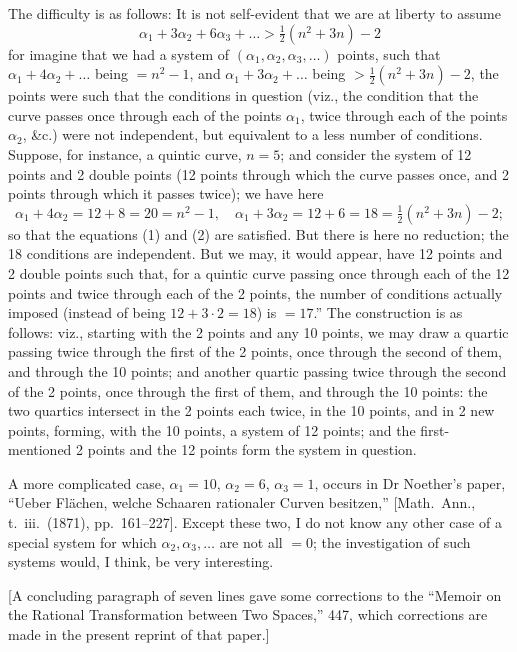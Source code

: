 \documentclass[11pt,a4paper]{article}
\begin{document}
The difficulty is as follows: It is not self-evident that we are at liberty to assume
\[
\alpha_1 + 3\alpha_2 + 6\alpha_3 + \ldots > \tfrac{1}{2}(n^2 + 3n) - 2
\]
for imagine that we had a system of $(\alpha_1, \alpha_2, \alpha_3, \ldots)$ points, such that $\alpha_1 + 4\alpha_2 + \ldots$ being $= n^2 - 1$, and $\alpha_1 + 3\alpha_2 + \ldots$ being $> \tfrac{1}{2}(n^2 + 3n) - 2$, the points were such that the conditions in question (viz., the condition that the curve passes once through each of the points $\alpha_1$, twice through each of the points $\alpha_2$, \&c.) were not independent, but equivalent to a less number of conditions. Suppose, for instance, a quintic curve, $n = 5$; and consider the system of 12 points and 2 double points (12 points through which the curve passes once, and 2 points through which it passes twice); we have here
\[
\alpha_1 + 4\alpha_2 = 12 + 8 = 20 = n^2 - 1,\quad \alpha_1 + 3\alpha_2 = 12 + 6 = 18 = \tfrac{1}{2}(n^2 + 3n) - 2;
\]
so that the equations (1) and (2) are satisfied. But there is here no reduction; the 18 conditions are independent. But we may, it would appear, have 12 points and 2 double points such that, for a quintic curve passing once through each of the 12 points and twice through each of the 2 points, the number of conditions actually imposed (instead of being $12 + 3 \cdot 2 = 18$) is $= 17$.'' The construction is as follows: viz., starting with the 2 points and any 10 points, we may draw a quartic passing twice through the first of the 2 points, once through the second of them, and through the 10 points; and another quartic passing twice through the second of the 2 points, once through the first of them, and through the 10 points: the two quartics intersect in the 2 points each twice, in the 10 points, and in 2 new points, forming, with the 10 points, a system of 12 points; and the first-mentioned 2 points and the 12 points form the system in question.

A more complicated case, $\alpha_1 = 10$, $\alpha_2 = 6$, $\alpha_3 = 1$, occurs in Dr Noether's paper, ``Ueber Fl\"achen, welche Schaaren rationaler Curven besitzen,'' [Math.\ Ann., t.~iii.\ (1871), pp.~161--227]. Except these two, I do not know any other case of a special system for which $\alpha_2, \alpha_3, \ldots$ are not all $= 0$; the investigation of such systems would, I think, be very interesting.

[A concluding paragraph of seven lines gave some corrections to the ``Memoir on the Rational Transformation between Two Spaces,'' 447, which corrections are made in the present reprint of that paper.]
\end{document}
